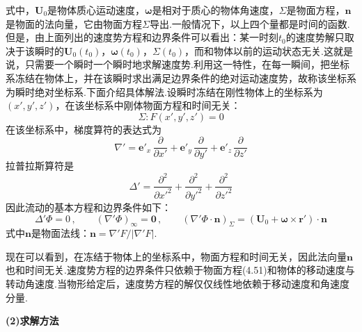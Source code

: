 式中，$\boldsymbol{U}_0$是物体质心运动速度，$\boldsymbol{\omega}$是相对于质心的物体角速度，$\Sigma$是物面方程，$\boldsymbol{n}$是物面的法向量，它由物面方程$\Sigma$导出.一般情况下，以上四个量都是时间的函数.但是，由上面列出的速度势方程和边界条件可以看出：某一时刻$t_0$的速度势解只取决于该瞬时的$\boldsymbol{U}_0(t_0)$，$\boldsymbol{\omega}(t_0)$，$\Sigma(t_0)$，而和物体以前的运动状态无关.这就是说，只需要一个瞬时一个瞬时地求解速度势.利用这一特性，在每一瞬间，把坐标系冻结在物体上，并在该瞬时求出满足边界条件的绝对运动速度势，故称该坐标系为瞬时绝对坐标系.下面介绍具体解法.设瞬时冻结在刚性物体上的坐标系为$(x',y',z')$，在该坐标系中刚体物面方程和时间无关：
\begin{equation*}
\Sigma:F(x',y',z')=0
\tag{4.51}
\end{equation*}
在该坐标系中，梯度算符的表达式为
\[
\nabla'=\boldsymbol{e}'_x\,\frac{\partial}{\partial x'}+\boldsymbol{e}'_y\,\frac{\partial}{\partial y'}+\boldsymbol{e}'_z\,\frac{\partial}{\partial z'}
\]
拉普拉斯算符是
\[
\Delta'=\frac{\partial^{2}}{\partial x'^{2}}+\frac{\partial^{2}}{\partial y'^{2}}+\frac{\partial^{2}}{\partial z'^{2}}
\]
因此流动的基本方程和边界条件如下：
\begin{equation*}
\Delta'\Phi=0\,,\qquad (\nabla'\Phi)_\infty=\boldsymbol{0}\,,\qquad (\nabla'\Phi\cdot\boldsymbol{n})_\Sigma=(\boldsymbol{U}_0+\boldsymbol{\omega}\times\boldsymbol{r}')\cdot\boldsymbol{n}
\tag{4.52}
\end{equation*}
式中$\boldsymbol{n}$是物面法线：$\boldsymbol{n}=\nabla'F/|\nabla'F|$.

现在可以看到，在冻结于物体上的坐标系中，物面方程和时间无关，因此法向量$\boldsymbol{n}$也和时间无关.速度势方程的边界条件只依赖于物面方程(4.51)和物体的移动速度与转动角速度.当物形给定后，速度势方程的解仅仅线性地依赖于移动速度和角速度分量.

\textbf{(2)求解方法}

